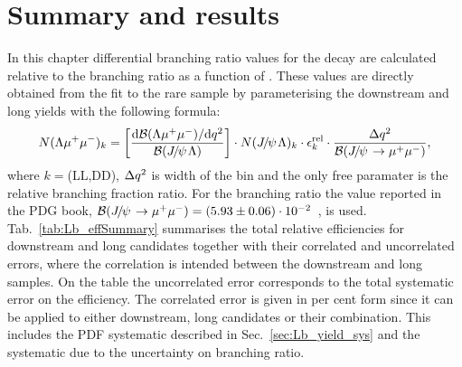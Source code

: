 \chapter{Summary and results}
\label{sec:Lb_BRsummary}

In this chapter differential branching ratio values for the \Lb\to\Lz\mumu decay are calculated 
relative to the \Lb\ra\jpsi\Lz branching ratio as a function of \qsq.
These values are directly obtained from the fit to the rare sample by parameterising
the downstream and long yields with the following formula:
%
\begin{equation}
N(\Lz\mumu)_{k}  = \left[ \frac{\mathrm{d}\mathcal{B}(\Lz\mumu)/\mathrm{d}\qsq}{\mathcal{B}(\jpsi\Lz)} \right]  \cdot
N(\jpsi\Lz)_{k} \cdot \epsilon^{\mathrm{rel}}_{k} \cdot \frac {\Delta\qsq} { \mathcal{B}(\jpsi\to\mumu) },
\label{eq:ield_from_BR}
\end{equation}
\noindent
where $k = $(LL,DD), $\Delta q^2$ is width of the \qsq bin and the only free paramater is the relative
branching fraction ratio.%
For the \jpsi\to\mumu branching ratio the value reported in the PDG book,
$\mathcal{B}(\jpsi\to\mumu) = (5.93 \pm 0.06)\cdot 10^{-2}$~\cite{PDG2014}, is used.
%
Tab.~\ref{tab:Lb_effSummary} summarises the total relative efficiencies for downstream and long candidates
together with their correlated and uncorrelated errors, where the correlation is intended between the downstream and long 
samples. %
On the table the uncorrelated error corresponds to the total systematic error on the efficiency.
The correlated error is given in per cent form since it can be applied to either downstream, long candidates or their combination.
This includes the PDF systematic described in Sec.~\ref{sec:Lb_yield_sys} and the systematic due to the uncertainty on \jpsi\to\mumu branching ratio.

